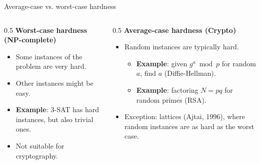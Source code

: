 \ifdefined\PRESENTATION\else\PassOptionsToClass{handout}{beamer}\fi\documentclass[aspectratio=169, lualatex]{beamer}
\begin{document}
\begin{frame}{Average-case vs. worst-case hardness}
	\begin{columns}[c]
		\begin{column}{0.5\textwidth}
			\textbf{Worst-case hardness (NP-complete)}
			\begin{itemize}[<+->]
				\item Some instances of the problem are very hard.
				\item Other instances might be easy.
				\item \textbf{Example}: 3-SAT has hard instances, but also trivial ones.
				\item Not suitable for cryptography.
			\end{itemize}
		\end{column}
		\begin{column}{0.5\textwidth}
			\textbf{Average-case hardness (Crypto)}
			\begin{itemize}[<+->]
				\item Random instances are typically hard.
				      \begin{itemize}
					      \item \textbf{Example}: given $g^a \bmod p$ for random $a$, find $a$ (Diffie-Hellman).
					      \item \textbf{Example}: factoring $N = pq$ for random primes (RSA).
				      \end{itemize}
				\item Exception: lattices (Ajtai, 1996), where random instances are as hard as the worst case.
			\end{itemize}
		\end{column}
	\end{columns}
\end{frame}
\end{document}
